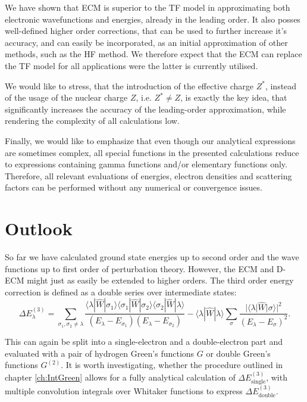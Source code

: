We have shown that ECM is superior to the TF model in approximating both electronic wavefunctions and energies, already in the leading order. It also posses well-defined higher order corrections, that can be used to further increase it's accuracy, and can easily be incorporated, as an initial approximation of other methods, such as the HF method. We therefore expect that the ECM can replace the TF model for all applications were the latter is currently utilised.

We would like to stress, that the introduction of the effective charge
$Z^{*}$, instead of the usage of the nuclear charge $Z$,
i.e. $Z^{*}\neq Z$, is exactly the key idea, that significantly
increases the accuracy of the leading-order approximation,
while rendering the complexity of all calculations low.


Finally, we would like to emphasize that even though our analytical
expressions are sometimes complex, all special functions in the
presented calculations reduce to expressions containing gamma
functions and/or elementary functions only. Therefore, all relevant
evaluations of energies, electron densities and scattering factors can
be performed without any numerical or convergence issues.

\section{Outlook}
			
So far we have calculated ground state energies up to second order and the wave functions up to first order of perturbation theory. However, the ECM and D-ECM might just as easily be extended to higher orders. The third order energy correction is defined as a double series over intermediate states:
\begin{equation}
\Delta E^{(3)}_{\lambda} = \sum_{\sigma_1,\sigma_2 \neq \lambda}\frac{\langle \lambda |\widehat{W}| \sigma_1 \rangle \langle \sigma_1 |\widehat{W}| \sigma_2 \rangle \langle \sigma_2 |\widehat{W}| \lambda \rangle }{(E_\lambda - E_{\sigma_1})(E_\lambda - E_{\sigma_2})} - \langle \lambda |\widehat{W}| \lambda \rangle \sum_{\sigma} \frac{|\langle \lambda |\widehat{W}| \sigma \rangle|^2}{(E_\lambda - E_\sigma)^2}.
\end{equation}
			
This can again be split into a single-electron and a double-electron part and evaluated with a pair of hydrogen Green's functions $G$ or double Green's functions $G^{(2)}$. It is worth investigating, whether the procedure outlined in chapter \ref{ch:IntGreen} allows for a fully analytical calculation of $\Delta E^{(3)}_{\mathrm{single}}$, with multiple convolution integrals over Whitaker functions to express $\Delta E^{(3)}_{\mathrm{double}}$.

